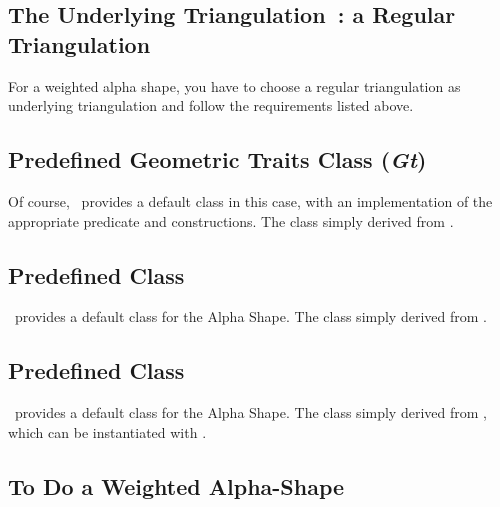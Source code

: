 \subsection*{The Underlying Triangulation~: a Regular Triangulation}

For a weighted alpha shape, you have to choose a regular triangulation as
underlying triangulation  and follow the requirements listed above.


\subsection*{Predefined Geometric Traits Class (\mbox{\it Gt})}

Of course, \cgal\ provides a default  class in this
case, with an implementation of the appropriate predicate and constructions.
The class  simply derived from 
.


\subsection*{Predefined \protect {} Class}

\cgal\ provides a default  class
for the Alpha Shape. The class
 simply derived from 
.


\subsection*{Predefined \protect {} Class}

\cgal\ provides a default  class
for the Alpha Shape. The class
 simply derived from 
, which can be instantiated with .



\subsection*{To Do a Weighted Alpha-Shape}

